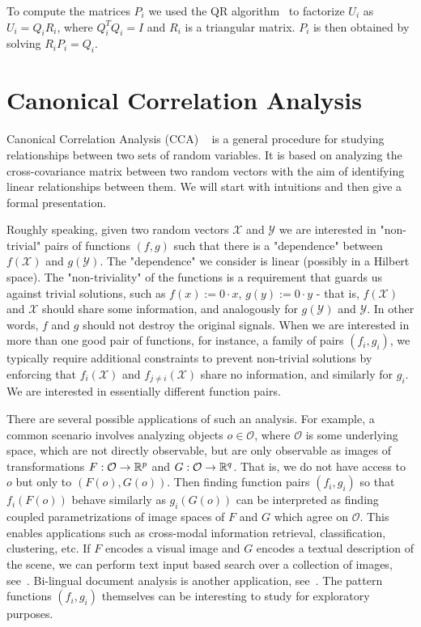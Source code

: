 To compute the matrices $P_i$ we used the QR algorithm~\cite{golub} to factorize $U_i$ as $U_i = Q_i R_i$, where $Q_i^TQ_i = I$ and $R_i$ is a triangular matrix. $P_i$ is then obtained by solving $R_i P_i = Q_i$.


\section{Canonical Correlation Analysis}

Canonical Correlation Analysis (CCA) ~\cite{Hotelling} is a general procedure for studying relationships between two sets of random variables. It is based on analyzing the cross-covariance matrix between two random vectors with the aim of identifying linear relationships between them. We will start with intuitions and then give a formal presentation.

Roughly speaking, given two random vectors $\mathcal{X}$ and $\mathcal{Y}$ we are interested in "non-trivial" pairs of functions $(f,g)$ such that there is a "dependence" between $f(\mathcal{X})$ and $g(\mathcal{Y})$. The "dependence" we consider is linear (possibly in a Hilbert space). The "non-triviality" of the functions is a requirement that guards us against trivial solutions, such as $f(x) := 0 \cdot x$, $g(y) := 0 \cdot y$ - that is, $f(\mathcal{X})$ and $\mathcal{X}$ should share some information, and analogously for $g(\mathcal{Y})$ and $\mathcal{Y}$. In other words, $f$ and $g$ should not destroy the original signals. When we are interested in more than one good pair of functions, for instance, a family of pairs $(f_i,g_i)$, we typically require additional constraints to prevent non-trivial solutions by enforcing that $f_i\left(\mathcal{X}\right)$ and $f_{j \neq i}\left(\mathcal{X}\right)$ share no information, and similarly for $g_i$. We are interested in essentially different function pairs.

There are several possible applications of such an analysis. For example, a common scenario involves analyzing objects $o \in \mathcal{O}$, where $\mathcal{O}$ is some underlying space, which are not directly observable, but are only observable as images of transformations $F: \mathcal{O} \rightarrow \mathbb{R}^p$ and $G: \mathcal{O} \rightarrow \mathbb{R}^q$. That is, we do not have access to $o$ but only to $\left(F(o), G(o)\right)$. Then finding function pairs $(f_i, g_i)$ so that $f_i(F(o))$ behave similarly as $g_i(G(o))$ can be interpreted as finding coupled parametrizations of image spaces of $F$ and $G$ which agree on $\mathcal{O}$. This enables applications such as cross-modal information retrieval, classification, clustering, etc. If $F$ encodes a visual image and $G$ encodes a textual description of the scene, we can perform text input based search over a collection of images, see~\cite{HardoonSS04}. Bi-lingual document analysis is another application, see~\cite{mrpqr}. The pattern functions $(f_i, g_i)$ themselves can be interesting to study for exploratory purposes.

